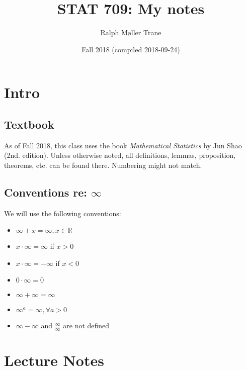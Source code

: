\documentclass[]{book}
\title{STAT 709: My notes}
\author{Ralph Møller Trane}
\date{Fall 2018 (compiled 2018-09-24)}
\providecommand{\tightlist}{%
  \setlength{\itemsep}{0pt}\setlength{\parskip}{0pt}}
\theoremstyle{definition}
\theoremstyle{definition}
\theoremstyle{definition}
\theoremstyle{remark}
\begin{document}
\maketitle

{
\setcounter{tocdepth}{1}
\tableofcontents
}
\newcommand{\mc}[1]{\mathcal{#1}}
\renewcommand{\B}{\mathcal{B}}
\renewcommand{\C}{\mathcal{C}}
\newcommand{\F}{\mathcal{F}}

\newcommand{\mb}[1]{\mathbb{#1}}
\renewcommand{\P}{\mathbb{P}}
\newcommand{\R}{\mathbb{R}}


\chapter{Intro}\label{intro}

\section{Textbook}\label{textbook}

As of Fall 2018, this class uses the book \emph{Mathematical Statistics}
by Jun Shao (2nd. edition). Unless otherwise noted, all definitions,
lemmas, proposition, theorems, etc. can be found there. Numbering might
not match.

\section{\texorpdfstring{Conventions re:
\(\infty\)}{Conventions re: \textbackslash{}infty}}\label{conventions-re-infty}

We will use the following conventions:

\begin{itemize}
\tightlist
\item
  \(\infty + x = \infty, x \in \R\)
\item
  \(x\cdot \infty = \infty\) if \(x > 0\)
\item
  \(x\cdot \infty = -\infty\) if \(x < 0\)
\item
  \(0\cdot \infty = 0\)
\item
  \(\infty + \infty = \infty\)
\item
  \(\infty^a = \infty, \forall a > 0\)
\item
  \(\infty - \infty\) and \(\frac{\infty}{\infty}\) are not defined
\end{itemize}

\chapter{Lecture Notes}\label{lectures}
\end{document}
